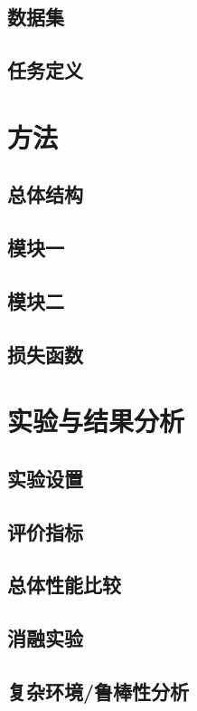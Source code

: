 \documentclass[conference]{IEEEtran}
\begin{document}
\subsection{数据集}
\subsection{任务定义}

\section{方法}
\subsection{总体结构}
\subsection{模块一}
\subsection{模块二}
\subsection{损失函数}

\section{实验与结果分析}
\subsection{实验设置}
\subsection{评价指标}
\subsection{总体性能比较}
\subsection{消融实验}
\subsection{复杂环境/鲁棒性分析}
\end{document}
